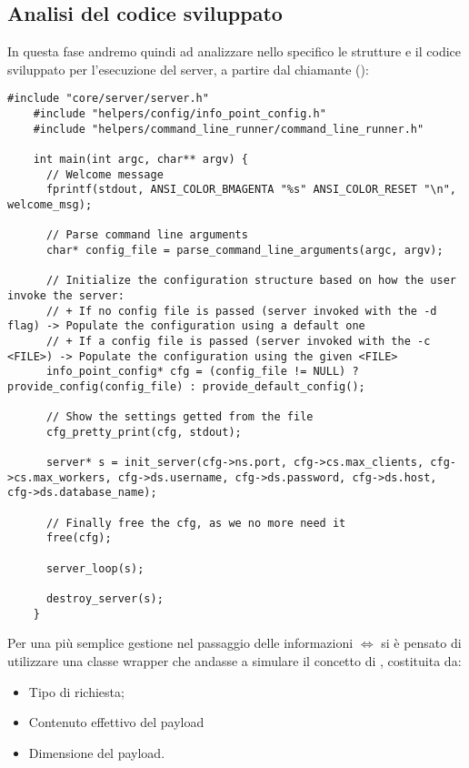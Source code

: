   \subsection{Analisi del codice sviluppato}
  In questa fase andremo quindi ad analizzare nello specifico le strutture e il codice sviluppato per l'esecuzione del server, a partire dal chiamante ():

  \begin{lstlisting}[language={[POSIX]C}, style=wnumbers]
    #include "core/server/server.h"
    #include "helpers/config/info_point_config.h"
    #include "helpers/command_line_runner/command_line_runner.h"

    int main(int argc, char** argv) {
      // Welcome message
      fprintf(stdout, ANSI_COLOR_BMAGENTA "%s" ANSI_COLOR_RESET "\n", welcome_msg);

      // Parse command line arguments
      char* config_file = parse_command_line_arguments(argc, argv);

      // Initialize the configuration structure based on how the user invoke the server:
      // + If no config file is passed (server invoked with the -d flag) -> Populate the configuration using a default one
      // + If a config file is passed (server invoked with the -c <FILE>) -> Populate the configuration using the given <FILE>
      info_point_config* cfg = (config_file != NULL) ? provide_config(config_file) : provide_default_config();

      // Show the settings getted from the file
      cfg_pretty_print(cfg, stdout);

      server* s = init_server(cfg->ns.port, cfg->cs.max_clients, cfg->cs.max_workers, cfg->ds.username, cfg->ds.password, cfg->ds.host, cfg->ds.database_name);

      // Finally free the cfg, as we no more need it
      free(cfg);

      server_loop(s);

      destroy_server(s);
    }
  \end{lstlisting}

  \begin{center}  \end{center}
  Per una più semplice gestione nel passaggio delle informazioni  $\Longleftrightarrow$  si è pensato di utilizzare una classe wrapper che andasse a simulare il concetto di \href{https://it.wikipedia.org/wiki/Carico_utile_(informatica)}{}, costituita da:
  \begin{itemize}
    \item Tipo di richiesta;
    \item Contenuto effettivo del payload \footnotemark {}
    \item Dimensione del payload.
  \end{itemize}

